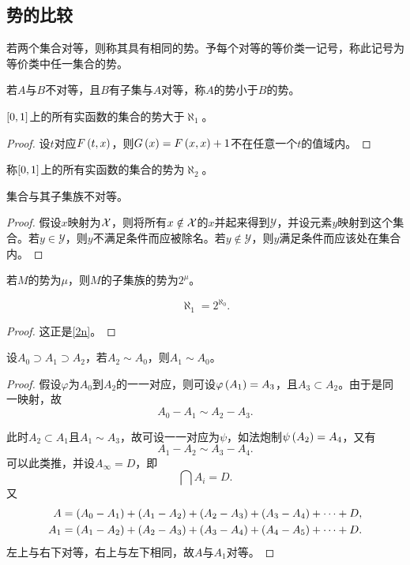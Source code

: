 \documentclass{ctexrep}
\begin{document}
  \subsection{势的比较}
  \begin{definition}
    若两个集合对等，则称其具有相同的势。予每个对等的等价类一记号，称此记号为等价类中任一集合的势。
  \end{definition}
  \begin{definition}
    若$A$与$B$不对等，且$B$有子集与$A$对等，称$A$的势小于$B$的势。
  \end{definition}
  \begin{theorem}
    $\left[0,1\right]$上的所有实函数的集合的势大于$\aleph_1$。
  \end{theorem}
  \begin{proof}
    设$t$对应$F\left(t,x\right)$，则$G\left(x\right)=F\left(x,x\right)+1$不在任意一个$t$的值域内。
  \end{proof}
  \begin{definition}
    称$\left[0,1\right]$上的所有实函数的集合的势为$\aleph_2$。
  \end{definition}
  \begin{theorem}
    集合与其子集族不对等。
  \end{theorem}
  \begin{proof}
    假设$x$映射为$\mathcal{X}$，则将所有$x\notin\mathcal{X}$的$x$并起来得到$\mathcal{Y}$，并设元素$y$映射到这个集合。若$y\in\mathcal{Y}$，则$y$不满足条件而应被除名。若$y\notin\mathcal{Y}$，则$y$满足条件而应该处在集合内。
  \end{proof}
  \begin{definition}
    若$M$的势为$\mu$，则$M$的子集族的势为$2^\mu$。
  \end{definition}
  \begin{theorem}
    \[ \aleph_1=2^{\aleph_0}. \]
  \end{theorem}
  \begin{proof}
    这正是\cref{2n}。
  \end{proof}
  \begin{theorem}
    设$A_0\supset A_1 \supset A_2$，若$A_2\sim A_0$，则$A_1 \sim A_0$。
  \end{theorem}
  \begin{proof}
    假设$\varphi$为$A_0$到$A_2$的一一对应，则可设$\varphi\left(A_1\right)=A_3$，且$A_3 \subset A_2$。由于是同一映射，故\[A_0-A_1\sim A_2-A_3.\]
    \par
    此时$A_2\subset A_1$且$A_1\sim A_3$，故可设一一对应为$\psi$，如法炮制$\psi\left(A_2\right)=A_4$，又有\[A_1-A_2 \sim A_3-A_4.\]
    可以此类推，并设$A_\infty = D$，即
    \[ \bigcap A_i = D. \]
    又
    \begin{align*}
      A &= \left(A_0-A_1\right)+\left(A_1-A_2\right)+\left(A_2-A_3\right)+\left(A_3-A_4\right)+\cdots+D,\\
      A_1 &= \left(A_1-A_2\right)+\left(A_2-A_3\right)+\left(A_3-A_4\right)+\left(A_4-A_5\right)+\cdots+D.
    \end{align*}
    左上与右下对等，右上与左下相同，故$A$与$A_1$对等。
  \end{proof}
\end{document}
